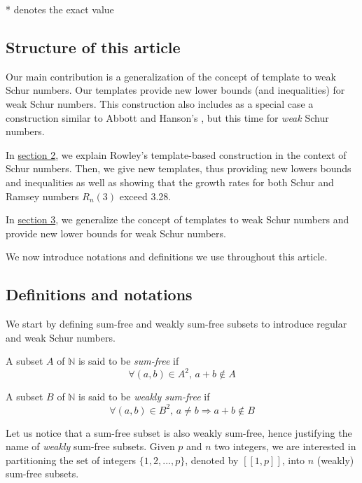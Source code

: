 \begin{center}
* denotes the exact value
\end{center}

\subsection{Structure of this article}

\qquad Our main contribution is a generalization of the concept of template to weak Schur numbers. Our templates 
provide new lower bounds (and inequalities) for weak Schur numbers. This construction also includes as a special case 
a construction similar to Abbott and Hanson's \cite{AbbottHanson}, but this time for \textit{weak} Schur numbers.

\par
In \hyperref[Schur]{section 2}, we explain Rowley's template-based construction in the context of 
Schur numbers. Then, we give new templates, thus providing new lowers bounds and inequalities as well as 
showing that the growth rates for both Schur and Ramsey numbers \(R_n(3)\) exceed 3.28. 

\par
In \hyperref[WeakSchur]{section 3}, we generalize the concept of templates to weak Schur numbers 
and provide new lower bounds for weak Schur numbers. 

\par
We now introduce notations and definitions we use throughout this article.

\subsection{Definitions and notations}

\qquad We start by defining sum-free and weakly sum-free subsets to introduce regular and weak Schur numbers.

\begin{definition}
A subset \(A\) of \(\mathbb{N}\) is said to be \textit{sum-free} if
\[ \forall (a,b) \in A^2 \text{, } a+b \notin A\]
\end{definition}

\begin{definition}
A subset \(B\) of \(\mathbb{N}\) is said to be \textit{weakly sum-free} if
\[ \forall (a,b) \in B^2 \text{, } a \neq b \Longrightarrow a+b \notin B\]
\end{definition}

Let us notice that a sum-free subset is also weakly sum-free, hence justifying the name of \textit{weakly} sum-free
subsets. Given \(p\) and \(n\) two integers, we are interested in partitioning the set of integers \(\{1, 2, ..., p\}\), 
denoted by \([\![1,p]\!]\), into \(n\) (weakly) sum-free subsets.

